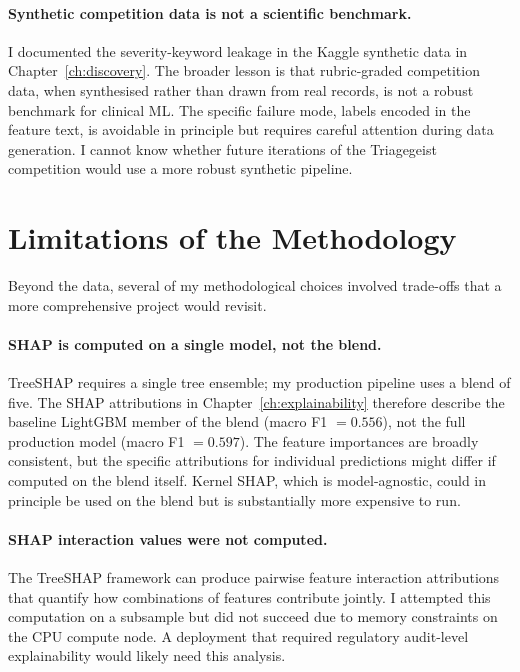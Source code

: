 \paragraph{Synthetic competition data is not a scientific benchmark.} I documented the severity-keyword leakage in the Kaggle synthetic data in Chapter~\ref{ch:discovery}. The broader lesson is that rubric-graded competition data, when synthesised rather than drawn from real records, is not a robust benchmark for clinical ML. The specific failure mode, labels encoded in the feature text, is avoidable in principle but requires careful attention during data generation. I cannot know whether future iterations of the Triagegeist competition would use a more robust synthetic pipeline.

\section{Limitations of the Methodology}

Beyond the data, several of my methodological choices involved trade-offs that a more comprehensive project would revisit.

\paragraph{SHAP is computed on a single model, not the blend.} TreeSHAP requires a single tree ensemble; my production pipeline uses a blend of five. The SHAP attributions in Chapter~\ref{ch:explainability} therefore describe the baseline LightGBM member of the blend (macro F1 $= 0.556$), not the full production model (macro F1 $= 0.597$). The feature importances are broadly consistent, but the specific attributions for individual predictions might differ if computed on the blend itself. Kernel SHAP, which is model-agnostic, could in principle be used on the blend but is substantially more expensive to run.

\paragraph{SHAP interaction values were not computed.} The TreeSHAP framework can produce pairwise feature interaction attributions that quantify how combinations of features contribute jointly. I attempted this computation on a subsample but did not succeed due to memory constraints on the CPU compute node. A deployment that required regulatory audit-level explainability would likely need this analysis.

